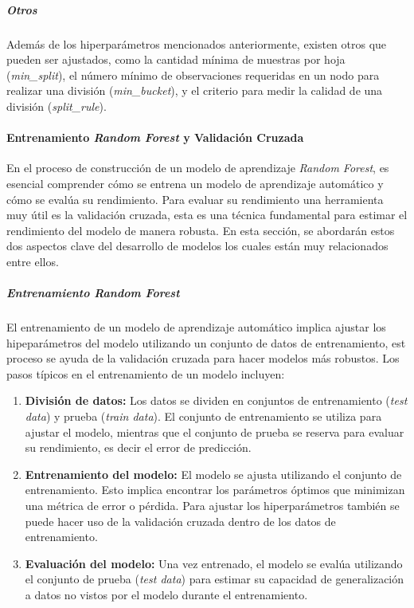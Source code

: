 \subparagraph{Otros}
Además de los hiperparámetros mencionados anteriormente, existen otros que pueden ser ajustados, como la cantidad mínima de muestras por hoja (\textit{min\_split}), el número mínimo de observaciones requeridas en un nodo para realizar una división (\textit{min\_bucket}), y el criterio para medir la calidad de una división (\textit{split\_rule}).

\paragraph{Entrenamiento \textit{Random Forest} y Validación Cruzada}\label{sec:entrenamiento-rf-validacion-cruzada}

En el proceso de construcción de un modelo de aprendizaje \textit{Random Forest}, es esencial comprender cómo se entrena un modelo de aprendizaje automático y cómo se evalúa su rendimiento. Para evaluar su rendimiento una herramienta muy útil es la validación cruzada, esta es una técnica fundamental para estimar el rendimiento del modelo de manera robusta. En esta sección, se abordarán estos dos aspectos clave del desarrollo de modelos los cuales están muy relacionados entre ellos.

\subparagraph{Entrenamiento \textit{Random Forest}}

El entrenamiento de un modelo de aprendizaje automático implica ajustar los hipeparámetros del modelo utilizando un conjunto de datos de entrenamiento, est proceso se ayuda de la validación cruzada para hacer modelos más robustos. Los pasos típicos en el entrenamiento de un modelo incluyen:

\begin{enumerate}  
  \item \textbf{División de datos:} Los datos se dividen en conjuntos de entrenamiento (\textit{test data}) y prueba (\textit{train data}). El conjunto de entrenamiento se utiliza para ajustar el modelo, mientras que el conjunto de prueba se reserva para evaluar su rendimiento, es decir el error de predicción.
  
  \item \textbf{Entrenamiento del modelo:} El modelo se ajusta utilizando el conjunto de entrenamiento. Esto implica encontrar los parámetros óptimos que minimizan una métrica de error o pérdida. Para ajustar los hiperparámetros también se puede hacer uso de la validación cruzada dentro de los datos de entrenamiento.
  
  \item \textbf{Evaluación del modelo:} Una vez entrenado, el modelo se evalúa utilizando el conjunto de prueba (\textit{test data}) para estimar su capacidad de generalización a datos no vistos por el modelo durante el entrenamiento.
\end{enumerate}

